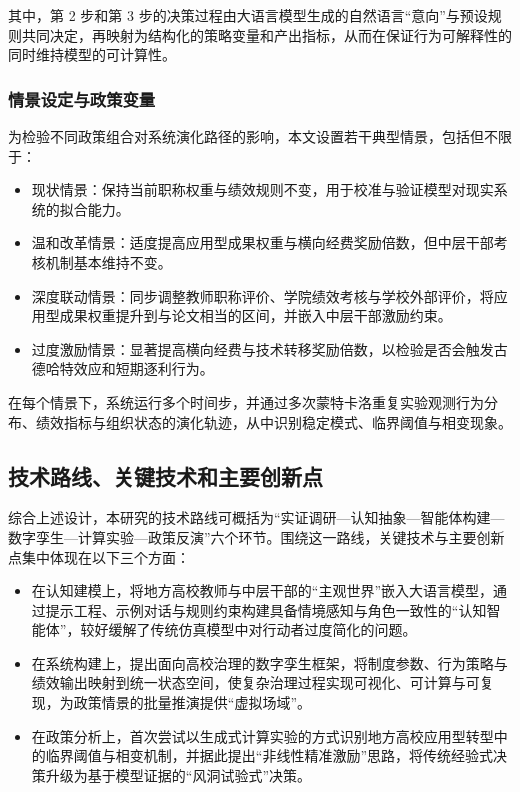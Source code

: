 \documentclass[UTF8, zihao=-4, fontset=mac]{ctexart}
\begin{document}
其中，第 2 步和第 3 步的决策过程由大语言模型生成的自然语言“意向”与预设规则共同决定，再映射为结构化的策略变量和产出指标，从而在保证行为可解释性的同时维持模型的可计算性。

\subsubsection{情景设定与政策变量}

为检验不同政策组合对系统演化路径的影响，本文设置若干典型情景，包括但不限于：

\begin{itemize}
    \item 现状情景：保持当前职称权重与绩效规则不变，用于校准与验证模型对现实系统的拟合能力。
    \item 温和改革情景：适度提高应用型成果权重与横向经费奖励倍数，但中层干部考核机制基本维持不变。
    \item 深度联动情景：同步调整教师职称评价、学院绩效考核与学校外部评价，将应用型成果权重提升到与论文相当的区间，并嵌入中层干部激励约束。
    \item 过度激励情景：显著提高横向经费与技术转移奖励倍数，以检验是否会触发古德哈特效应和短期逐利行为。
\end{itemize}

在每个情景下，系统运行多个时间步，并通过多次蒙特卡洛重复实验观测行为分布、绩效指标与组织状态的演化轨迹，从中识别稳定模式、临界阈值与相变现象。

\subsection{技术路线、关键技术和主要创新点}

综合上述设计，本研究的技术路线可概括为“实证调研—认知抽象—智能体构建—数字孪生—计算实验—政策反演”六个环节。围绕这一路线，关键技术与主要创新点集中体现在以下三个方面：

\begin{itemize}
    \item 在认知建模上，将地方高校教师与中层干部的“主观世界”嵌入大语言模型，通过提示工程、示例对话与规则约束构建具备情境感知与角色一致性的“认知智能体”，较好缓解了传统仿真模型中对行动者过度简化的问题。
    \item 在系统构建上，提出面向高校治理的数字孪生框架，将制度参数、行为策略与绩效输出映射到统一状态空间，使复杂治理过程实现可视化、可计算与可复现，为政策情景的批量推演提供“虚拟场域”。
    \item 在政策分析上，首次尝试以生成式计算实验的方式识别地方高校应用型转型中的临界阈值与相变机制，并据此提出“非线性精准激励”思路，将传统经验式决策升级为基于模型证据的“风洞试验式”决策。
\end{itemize}
\end{document}
